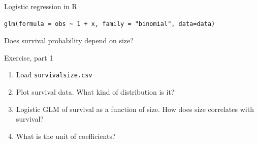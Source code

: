 \documentclass[10pt]{beamer}
\makeatletter
\newenvironment{kframe}{%
 \def\at@end@of@kframe{}%
 \ifinner\ifhmode%
  \def\at@end@of@kframe{\end{minipage}}%
  \begin{minipage}{\columnwidth}%
 \fi\fi%
 \def\FrameCommand##1{\hskip\@totalleftmargin \hskip-\fboxsep
 \colorbox{shadecolor}{##1}\hskip-\fboxsep
     \hskip-\linewidth \hskip-\@totalleftmargin \hskip\columnwidth}%
 \MakeFramed {\advance\hsize-\width
   \@totalleftmargin\z@ \linewidth\hsize
   \@setminipage}}%
 {\par\unskip\endMakeFramed%
 \at@end@of@kframe}
\newenvironment{knitrout}{}{} %
\makeatother
\begin{document}
\begin{frame}[fragile]{Logistic regression in R} 

    
\begin{knitrout}
\color{fgcolor}\begin{kframe}
\begin{verbatim}
glm(formula = obs ~ 1 + x, family = "binomial", data=data)
\end{verbatim}
\end{kframe}
\end{knitrout}

\end{frame}
\begin{frame}{Does survival probability depend on size?}
 
 \begin{exampleblock}{Exercise, part 1}
    \begin{enumerate}
      \item Load \texttt{survivalsize.csv}
      \item Plot survival data. What kind of distribution is it?
      \item Logistic GLM of survival as a function of size. How does size correlates with survival?
      \item What is the unit of coefficients?
    \end{enumerate}
  \end{exampleblock}
  
\end{frame}
\end{document}
